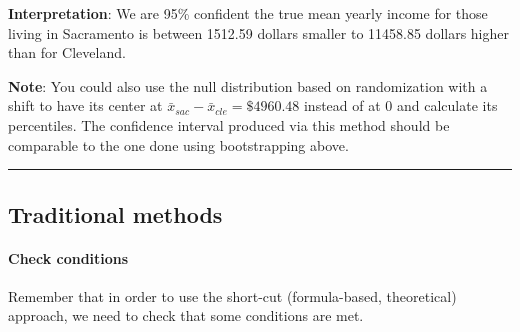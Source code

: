 \documentclass[]{tufte-book}
\let\oldrule=\rule
\renewcommand{\rule}[1]{\oldrule{\linewidth}}
\begin{document}
\textbf{Interpretation}: We are 95\% confident the true mean yearly
income for those living in Sacramento is between 1512.59 dollars smaller
to 11458.85 dollars higher than for Cleveland.

\textbf{Note}: You could also use the null distribution based on
randomization with a shift to have its center at
\(\bar{x}_{sac} - \bar{x}_{cle} = \$4960.48\) instead of at 0 and
calculate its percentiles. The confidence interval produced via this
method should be comparable to the one done using bootstrapping above.

\begin{center}\rule{0.5\linewidth}{\linethickness}\end{center}

\subsection{Traditional methods}\label{traditional-methods-3}

\paragraph{Check conditions}\label{check-conditions-3}

Remember that in order to use the short-cut (formula-based, theoretical)
approach, we need to check that some conditions are met.
\end{document}
